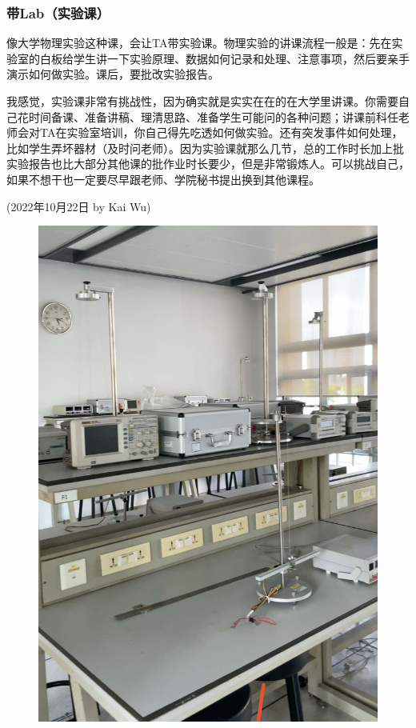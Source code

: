 \subsubsection{带Lab（实验课）}
\begin{newminipage}[0.55]
    像大学物理实验这种课，会让TA带实验课。物理实验的讲课流程一般是：先在实验室的白板给学生讲一下实验原理、数据如何记录和处理、注意事项，然后要亲手演示如何做实验。课后，要批改实验报告。

    我感觉，实验课非常有挑战性，因为确实就是实实在在的在大学里讲课。你需要自己花时间备课、准备讲稿、理清思路、准备学生可能问的各种问题；讲课前科任老师会对TA在实验室培训，你自己得先吃透如何做实验。还有突发事件如何处理，比如学生弄坏器材（及时问老师）。因为实验课就那么几节，总的工作时长加上批实验报告也比大部分其他课的批作业时长要少，但是非常锻炼人。可以挑战自己，如果不想干也一定要尽早跟老师、学院秘书提出换到其他课程。
    \begin{flushright}
        (2022年10月22日 by Kai Wu)
    \end{flushright}
\end{newminipage}
%
\begin{newminipage}[0.45]
    \begin{figure}[H]
        \includegraphics[width=0.95\columnwidth, right]{author-folder/Kai.Wu/lab.jpg}
    \end{figure}
\end{newminipage}




